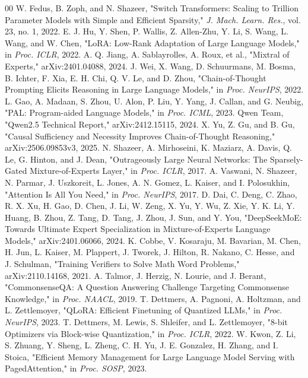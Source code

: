 \documentclass[conference,compsoc]{IEEEtran}
\begin{document}
\clearpage
\balance

\begin{thebibliography}{00}
 W. Fedus, B. Zoph, and N. Shazeer, "Switch Transformers: Scaling to Trillion Parameter Models with Simple and Efficient Sparsity," \emph{J. Mach. Learn. Res.}, vol. 23, no. 1, 2022.
 E. J. Hu, Y. Shen, P. Wallis, Z. Allen-Zhu, Y. Li, S. Wang, L. Wang, and W. Chen, "LoRA: Low-Rank Adaptation of Large Language Models," in \emph{Proc. ICLR}, 2022.
 A. Q. Jiang, A. Sablayrolles, A. Roux, et al., "Mixtral of Experts," arXiv:2401.04088, 2024.
 J. Wei, X. Wang, D. Schuurmans, M. Bosma, B. Ichter, F. Xia, E. H. Chi, Q. V. Le, and D. Zhou, "Chain-of-Thought Prompting Elicits Reasoning in Large Language Models," in \emph{Proc. NeurIPS}, 2022.
 L. Gao, A. Madaan, S. Zhou, U. Alon, P. Liu, Y. Yang, J. Callan, and G. Neubig, "PAL: Program-aided Language Models," in \emph{Proc. ICML}, 2023.
 Qwen Team, "Qwen2.5 Technical Report," arXiv:2412.15115, 2024.
 X. Yu, Z. Gu, and B. Gu, "Causal Sufficiency and Necessity Improves Chain-of-Thought Reasoning," arXiv:2506.09853v3, 2025.
 N. Shazeer, A. Mirhoseini, K. Maziarz, A. Davis, Q. Le, G. Hinton, and J. Dean, "Outrageously Large Neural Networks: The Sparsely-Gated Mixture-of-Experts Layer," in \emph{Proc. ICLR}, 2017.
 A. Vaswani, N. Shazeer, N. Parmar, J. Uszkoreit, L. Jones, A. N. Gomez, L. Kaiser, and I. Polosukhin, "Attention Is All You Need," in \emph{Proc. NeurIPS}, 2017.
 D. Dai, C. Deng, C. Zhao, R. X. Xu, H. Gao, D. Chen, J. Li, W. Zeng, X. Yu, Y. Wu, Z. Xie, Y. K. Li, Y. Huang, B. Zhou, Z. Tang, D. Tang, J. Zhou, J. Sun, and Y. You, "DeepSeekMoE: Towards Ultimate Expert Specialization in Mixture-of-Experts Language Models," arXiv:2401.06066, 2024.
 K. Cobbe, V. Kosaraju, M. Bavarian, M. Chen, H. Jun, L. Kaiser, M. Plappert, J. Tworek, J. Hilton, R. Nakano, C. Hesse, and J. Schulman, "Training Verifiers to Solve Math Word Problems," arXiv:2110.14168, 2021.
 A. Talmor, J. Herzig, N. Lourie, and J. Berant, "CommonsenseQA: A Question Answering Challenge Targeting Commonsense Knowledge," in \emph{Proc. NAACL}, 2019.
 T. Dettmers, A. Pagnoni, A. Holtzman, and L. Zettlemoyer, "QLoRA: Efficient Finetuning of Quantized LLMs," in \emph{Proc. NeurIPS}, 2023.
 T. Dettmers, M. Lewis, S. Shleifer, and L. Zettlemoyer, "8-bit Optimizers via Block-wise Quantization," in \emph{Proc. ICLR}, 2022.
 W. Kwon, Z. Li, S. Zhuang, Y. Sheng, L. Zheng, C. H. Yu, J. E. Gonzalez, H. Zhang, and I. Stoica, "Efficient Memory Management for Large Language Model Serving with PagedAttention," in \emph{Proc. SOSP}, 2023.

\end{thebibliography}
\end{document}
